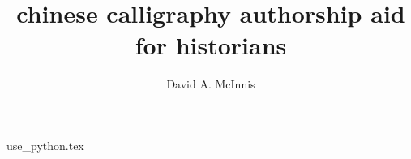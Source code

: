 \documentclass{ewuthesis}
\begin{document}
    \title{chinese calligraphy authorship aid for historians}
    \author{David A. McInnis}    
    \frontmatter
%    
    {use_python.tex}
    
    
    
    
\end{document}
